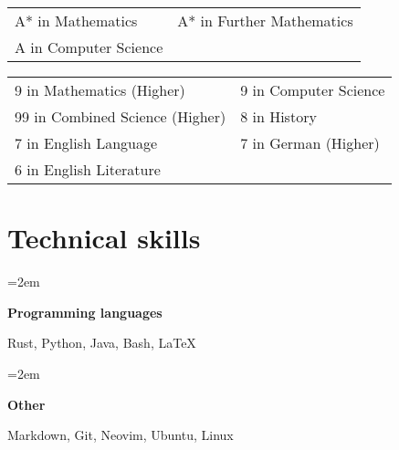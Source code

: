 \documentclass[a4paper, 12pt]{article}
\newlength{\spacebox}
\newcommand{\skill}[2]{
	\noindent\hangindent=2em\hangafter=0
	\parbox{3\spacebox}{
		\textbf{#1}}
	#2 \par}
\begin{document}
\begin{center}
\end{center}

\begin{center}
	\begin{tabular}{m{12em} m{12em}}
		A* in Mathematics & A* in Further Mathematics \\
		A in Computer Science
	\end{tabular}
\end{center}

\begin{center}
\end{center}

\begin{center}
	\begin{tabular}{m{16em} m{10em}}
		9 in Mathematics (Higher) & 9 in Computer Science \\
		99 in Combined Science (Higher) & 8 in History \\
		7 in English Language & 7 in German (Higher) \\
		6 in English Literature
	\end{tabular}
\end{center}

\section*{Technical skills}
\skill{Programming languages}{Rust, Python, Java, Bash, \LaTeX}
\skill{Other}{Markdown, Git, Neovim, Ubuntu, Linux}
\end{document}
